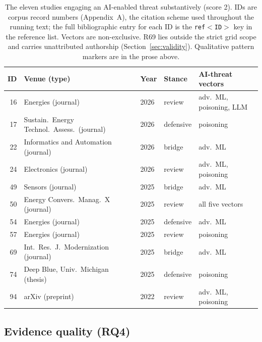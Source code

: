 \documentclass[preprint,12pt]{elsarticle}
\renewcommand{\_}{\plainunderscore\allowbreak}
\begin{document}
\begin{table}[t]
\centering
\caption{The eleven studies engaging an AI-enabled threat substantively (score 2). IDs are
corpus record numbers (Appendix~A), the citation scheme used throughout the running text;
the full bibliographic entry for each ID is the \texttt{ref$<$ID$>$} key in the reference
list. Vectors are non-exclusive. R69 lies outside the strict grid scope and carries
unattributed authorship (Section~\ref{sec:validity}).
Qualitative pattern markers are in the prose above.}
\label{tab:substantive}
\small
\begin{tabular}{@{}r p{4.9cm} lll@{}}
\toprule
ID & Venue (type) & Year & Stance & AI-threat vectors \\
\midrule
16 & Energies (journal)                           & 2026 & review    & adv.\ ML, poisoning, LLM \\
17 & Sustain.\ Energy Technol.\ Assess.\ (journal) & 2026 & defensive & poisoning \\
22 & Informatics and Automation (journal)         & 2026 & bridge    & adv.\ ML \\
24 & Electronics (journal)                        & 2026 & review    & adv.\ ML, poisoning \\
49 & Sensors (journal)                            & 2025 & bridge    & adv.\ ML \\
50 & Energy Convers.\ Manag.\ X (journal)            & 2025 & review    & all five vectors \\
54 & Energies (journal)                           & 2025 & defensive & adv.\ ML \\
57 & Energies (journal)                           & 2025 & review    & poisoning \\
69 & Int.\ Res.\ J.\ Modernization (journal)      & 2025 & bridge    & adv.\ ML \\
74 & Deep Blue, Univ.\ Michigan (thesis)          & 2025 & defensive & poisoning \\
94 & arXiv (preprint)                             & 2022 & review    & adv.\ ML, poisoning \\
\bottomrule
\end{tabular}
\end{table}

\subsection{Evidence quality (RQ4)}\label{sec:evidence}
\end{document}
